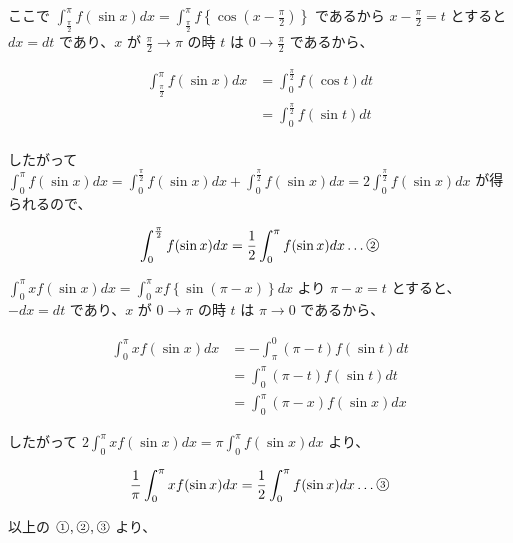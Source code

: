 \documentclass[a4j]{jsarticle}
\newcommand{\ctext}[1]{\raise0.2ex\hbox{\textcircled{\scriptsize{#1}}}} %
\begin{document}
    ここで $\displaystyle \int_{\frac{\pi}{2}}^{\pi} f(\sin x) dx = \int_{\frac{\pi}{2}}^{\pi} f \left\{ \cos\left(x - \frac{\pi}{2}\right) \right\}$ であるから $\displaystyle x - \frac{\pi}{2} = t$ とすると
    $\displaystyle dx = dt$ であり、$\displaystyle x$ が $\displaystyle \frac{\pi}{2} \rightarrow \pi$ の時 $\displaystyle t$ は $\displaystyle 0 \rightarrow \frac{\pi}{2}$ であるから、

    \begin{align*}
        \int_{\frac{\pi}{2}}^{\pi} f(\sin x)dx &= \int_{0}^{\frac{\pi}{2}} f(\cos t)dt \\
        &= \int_{0}^{\frac{\pi}{2}} f(\sin t) dt \\
    \end{align*}

    したがって $ \displaystyle \int_{0}^{\pi} f(\sin x)dx = \int_{0}^{\frac{\pi}{2}} f(\sin x)dx + \int_{0}^{\frac{\pi}{2}} f(\sin x)dx = 2 \int_{0}^{\frac{\pi}{2}} f(\sin x)dx $ が得られるので、

    \begin{equation*}
        \int_{0}^{\frac{\pi}{2}} f(\sin x)dx = \frac{1}{2} \int_{0}^{\pi} f(\sin x)dx \dots \ctext{2}
    \end{equation*}

    $\displaystyle \int_{0}^{\pi} x f(\sin x)dx = \int_{0}^{\pi} xf\left\{ \sin \left(\pi - x \right) \right\} dx$ より $\displaystyle \pi - x = t$ とすると、
    $\displaystyle -dx = dt$ であり、$\displaystyle x$ が $\displaystyle 0 \rightarrow \pi$ の時 $\displaystyle t$ は $\displaystyle \pi \rightarrow 0$ であるから、

    \begin{align*}
        \int_{0}^{\pi} xf(\sin x)dx &= -\int_{\pi}^{0} (\pi - t)f(\sin t)dt \\
        &= \int_{0}^{\pi} (\pi - t)f(\sin t)dt \\
        &= \int_{0}^{\pi} (\pi - x)f(\sin x)dx
    \end{align*}

    したがって $\displaystyle 2\int_{0}^{\pi} xf(\sin x)dx = \pi \int_{0}^{\pi} f(\sin x)dx$ より、

    \begin{equation*}
        \frac{1}{\pi} \int_{0}^{\pi} xf( \sin x) dx = \frac{1}{2} \int_{0}^{\pi} f(\sin x) dx \dots \ctext{3}
    \end{equation*}

    以上の $\ctext{1}, \ctext{2}, \ctext{3}$ より、
\end{document}
